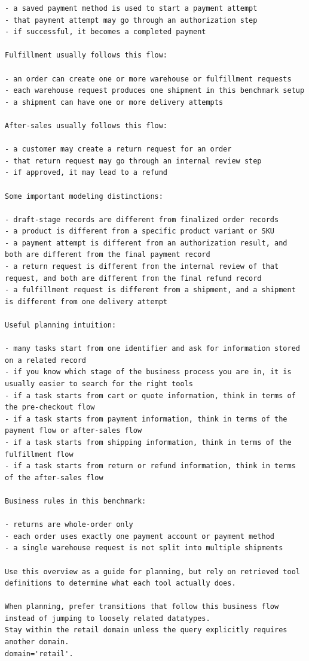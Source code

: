 \documentclass{llmxive}
\begin{document}
\begin{center}
\begin{tcolorbox}
\begin{lstlisting}[basicstyle=\ttfamily\footnotesize,breaklines=true,columns=fullflexible,keepspaces=true]
- a saved payment method is used to start a payment attempt
- that payment attempt may go through an authorization step
- if successful, it becomes a completed payment

Fulfillment usually follows this flow:

- an order can create one or more warehouse or fulfillment requests
- each warehouse request produces one shipment in this benchmark setup
- a shipment can have one or more delivery attempts

After-sales usually follows this flow:

- a customer may create a return request for an order
- that return request may go through an internal review step
- if approved, it may lead to a refund

Some important modeling distinctions:

- draft-stage records are different from finalized order records
- a product is different from a specific product variant or SKU
- a payment attempt is different from an authorization result, and both are different from the final payment record
- a return request is different from the internal review of that request, and both are different from the final refund record
- a fulfillment request is different from a shipment, and a shipment is different from one delivery attempt

Useful planning intuition:

- many tasks start from one identifier and ask for information stored on a related record
- if you know which stage of the business process you are in, it is usually easier to search for the right tools
- if a task starts from cart or quote information, think in terms of the pre-checkout flow
- if a task starts from payment information, think in terms of the payment flow or after-sales flow
- if a task starts from shipping information, think in terms of the fulfillment flow
- if a task starts from return or refund information, think in terms of the after-sales flow

Business rules in this benchmark:

- returns are whole-order only
- each order uses exactly one payment account or payment method
- a single warehouse request is not split into multiple shipments

Use this overview as a guide for planning, but rely on retrieved tool definitions to determine what each tool actually does.

When planning, prefer transitions that follow this business flow instead of jumping to loosely related datatypes.
Stay within the retail domain unless the query explicitly requires another domain.
domain='retail'.


\end{lstlisting}
\end{tcolorbox}
\end{center}
\end{document}
